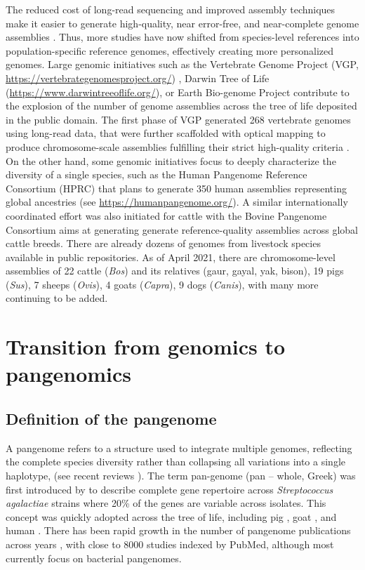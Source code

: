 \documentclass[../main.tex]{subfiles}
\begin{document}
The reduced cost of long-read sequencing and improved assembly techniques  make it easier to generate high-quality, near error-free, and near-complete genome assemblies \citep{miga2020telomere,logsdon2021structure}. Thus, more studies have now shifted from species-level references into population-specific reference genomes, effectively creating more personalized genomes. Large genomic initiatives such as the Vertebrate Genome Project (VGP, \url{https://vertebrategenomesproject.org/}) \citep{Rhie2021}, Darwin Tree of Life (\url{https://www.darwintreeoflife.org/}), or Earth Bio-genome Project \citep{lewin2018earth} contribute to the explosion of the number of genome assemblies across the tree of life deposited in the public domain. The first phase of VGP generated 268 vertebrate genomes using long-read data, that were further scaffolded with optical mapping to produce chromosome-scale assemblies fulfilling their strict high-quality criteria \citep{Rhie2021}. On the other hand, some genomic initiatives focus to deeply characterize the diversity of a single species, such as the Human Pangenome Reference Consortium (HPRC) that plans to generate 350 human assemblies representing global ancestries (see \url{https://humanpangenome.org/}). A similar internationally coordinated effort was also initiated for cattle with the Bovine Pangenome Consortium \citep{heaton2021reference} aims at generating generate reference-quality assemblies across global cattle breeds. There are already dozens of genomes from livestock species available in public repositories. As of April 2021, there are chromosome-level assemblies of 22 cattle (\emph{Bos}) and its relatives (gaur, gayal, yak, bison), 19 pigs (\emph{Sus}), 7 sheeps (\emph{Ovis}), 4 goats (\emph{Capra}), 9 dogs (\emph{Canis}), with many more continuing to be added.

\section{Transition from genomics to pangenomics}

\subsection*{Definition of the pangenome}

A pangenome refers to a structure used to  integrate multiple genomes, reflecting the complete species diversity rather than collapsing all variations into a single haplotype, (see recent reviews \citep{bayer2020plant,sherman2020pan,della2021pan}). The term pan-genome (pan – whole, Greek) was first introduced by \citet{tettelin2005genome} to describe complete gene repertoire across \emph{Streptococcus agalactiae} strains where 20\% of the genes are variable across isolates. This concept was quickly adopted across the tree of life, including pig \citep{li2017comprehensive,tian2019building}, goat \citep{li2019towards}, and human \citep{duan2019hupan,sherman2019assembly}. There has been rapid growth in the number of pangenome publications across years \citep{bayer2020plant}, with close to 8000 studies indexed by PubMed,  although most currently focus on bacterial pangenomes.  
\end{document}
